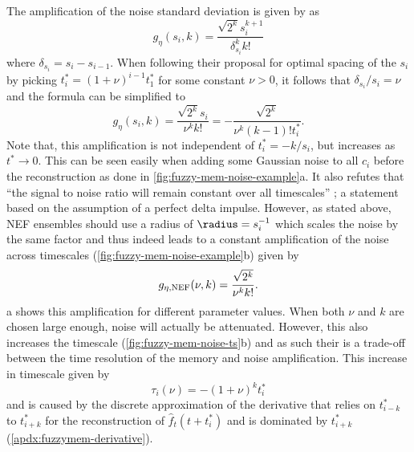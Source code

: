 The amplification of the noise standard deviation is given by \textcite{shankar2013} as
\begin{equation}
    g_{\eta}(s_i, k) = \frac{\sqrt{2^k} s_i^{k+1}}{\delta_{s_i}^k k!}
\end{equation}
where $\delta_{s_i} = s_i - s_{i - 1}$. 
When following their proposal for optimal spacing of the $s_i$ by picking $t_i^* = {(1 + \nu)}^{i - 1} t_1^*$ for some constant $\nu > 0$, it follows that $\delta_{s_i} / s_i = \nu$ and the formula can be simplified to
\begin{equation}
    g_{\eta}(s_i, k) = \frac{\sqrt{2^k} s_i}{\nu^k k!} = - \frac{\sqrt{2^k}}{\nu^k (k-1)! t_i^*} \text{.}
\end{equation}
Note that, this amplification is not independent of $t_i^* = -k/s_i$, but increases as $t^* \rightarrow 0$.
This can be seen easily when adding some Gaussian noise to all $c_i$ before the reconstruction as done in \cref{fig:fuzzy-mem-noise-example}a.
It also refutes that ``the signal to noise ratio will remain constant over all timescales'' \parencite{shankar2013}; a statement based on the assumption of a perfect delta impulse.
However, as stated above, NEF ensembles should use a radius of $\radius = s_i^{-1}$ which scales the noise by the same factor and thus indeed leads to a constant amplification of the noise across timescales (\cref{fig:fuzzy-mem-noise-example}b) given by
\begin{equation}
    g_{\eta,{\mathrm{NEF}}}(\nu, k) = \frac{\sqrt{2^k}}{\nu^k k!} \text{.}
\end{equation}
a shows this amplification for different parameter values.
When both $\nu$ and $k$ are chosen large enough, noise will actually be attenuated.
However, this also increases the timescale (\cref{fig:fuzzy-mem-noise-ts}b) and as such their is a trade-off between the time resolution of the memory and noise amplification.
This increase in timescale given by
\begin{equation}
    \tau_i(\nu) = - {(1 + \nu)}^k t^*_i \label{eqn:fuzzymem-ts}
\end{equation}
and is caused by the discrete approximation of the derivative that relies on $t^*_{i - k}$ to $t^*_{i + k}$ for the reconstruction of $\hat{f}_t(t + t^*_i)$ and is dominated by $t^*_{i + k}$ (\cref{apdx:fuzzymem-derivative}).

